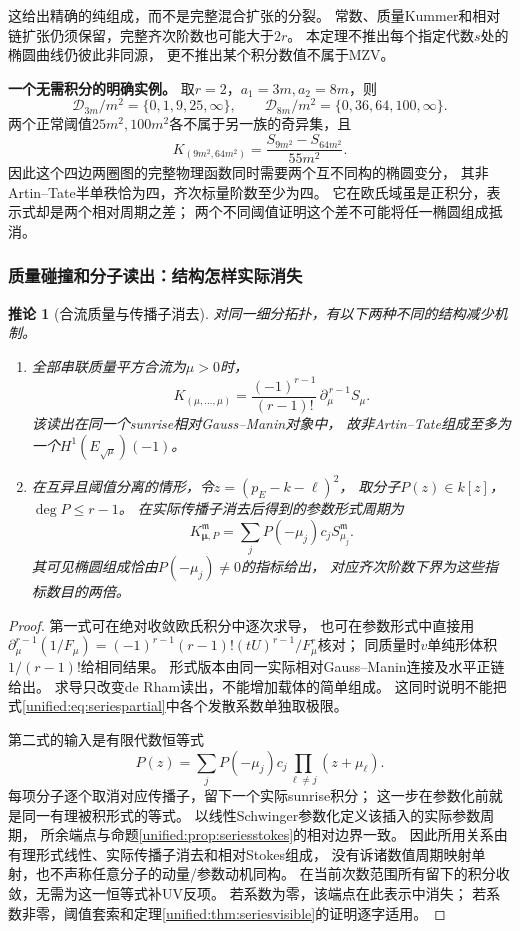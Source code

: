 \documentclass[11pt,a4paper,oneside]{ctexart}
\theoremstyle{cnplain}
\newtheorem{corollary}[theorem]{推论}
\theoremstyle{definition}
\theoremstyle{remark}
\numberwithin{equation}{section}
\begin{document}
这给出精确的纯组成，而不是完整混合扩张的分裂。
常数、质量Kummer和相对链扩张仍须保留，完整齐次阶数也可能大于$2r$。
本定理不推出每个指定代数$s$处的椭圆曲线仍彼此非同源，
更不推出某个积分数值不属于MZV。

\textbf{一个无需积分的明确实例。}
取$r=2$，$a_1=3m,a_2=8m$，则
\[
 \mathcal D_{3m}/m^2=\{0,1,9,25,\infty\},\qquad
 \mathcal D_{8m}/m^2=\{0,36,64,100,\infty\}.
\]
两个正常阈值$25m^2,100m^2$各不属于另一族的奇异集，且
\[
 K_{(9m^2,64m^2)}
   =\frac{S_{9m^2}-S_{64m^2}}{55m^2}.
\]
因此这个四边两圈图的完整物理函数同时需要两个互不同构的椭圆变分，
其非Artin--Tate半单秩恰为四，齐次标量阶数至少为四。
它在欧氏域虽是正积分，表示式却是两个相对周期之差；
两个不同阈值证明这个差不可能将任一椭圆组成抵消。

\subsubsection{质量碰撞和分子读出：结构怎样实际消失}
\begin{corollary}[合流质量与传播子消去]\label{unified:cor:seriesselect}
对同一细分拓扑，有以下两种不同的结构减少机制。
\begin{enumerate}
\item 全部串联质量平方合流为$\mu>0$时，
\[
 K_{(\mu,\ldots,\mu)}
   =\frac{(-1)^{r-1}}{(r-1)!}\,\partial_\mu^{\,r-1}S_\mu .
\]
该读出在同一个sunrise相对Gauss--Manin对象中，
故非Artin--Tate组成至多为一个$H^1(E_{\sqrt\mu})(-1)$。
\item 在互异且阈值分离的情形，令$z=(p_E-k-\ell)^2$，
取分子$P(z)\in k[z]$，$\deg P\le r-1$。
在实际传播子消去后得到的参数形式周期为
\[
 K_{\boldsymbol\mu,P}^{\mathfrak m}
    =\sum_j P(-\mu_j)c_jS_{\mu_j}^{\mathfrak m}.
\]
其可见椭圆组成恰由$P(-\mu_j)\ne0$的指标给出，
对应齐次阶数下界为这些指标数目的两倍。
\end{enumerate}
\end{corollary}
\begin{proof}
第一式可在绝对收敛欧氏积分中逐次求导，
也可在参数形式中直接用
$\partial_\mu^{r-1}(1/F_\mu)
=(-1)^{r-1}(r-1)!(tU)^{r-1}/F_\mu^r$核对；
同质量时$v$单纯形体积$1/(r-1)!$给相同结果。
形式版本由同一实际相对Gauss--Manin连接及水平正链给出。
求导只改变de Rham读出，不能增加载体的简单组成。
这同时说明不能把式\eqref{unified:eq:seriespartial}中各个发散系数单独取极限。

第二式的输入是有限代数恒等式
\[
 P(z)=\sum_j P(-\mu_j)c_j\prod_{\ell\ne j}(z+\mu_\ell).
\]
每项分子逐个取消对应传播子，留下一个实际sunrise积分；
这一步在参数化前就是同一有理被积形式的等式。
以线性Schwinger参数化定义该插入的实际参数周期，
所余端点与命题\ref{unified:prop:seriesstokes}的相对边界一致。
因此所用关系由有理形式线性、实际传播子消去和相对Stokes组成，
没有诉诸数值周期映射单射，也不声称任意分子的动量/参数动机同构。
在当前次数范围所有留下的积分收敛，无需为这一恒等式补UV反项。
若系数为零，该端点在此表示中消失；
若系数非零，阈值套索和定理\ref{unified:thm:seriesvisible}的证明逐字适用。
\end{proof}
\end{document}
